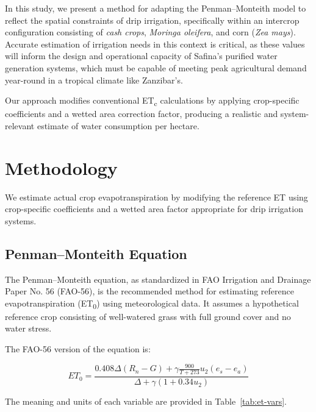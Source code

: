 \documentclass[twocolumn]{article}
\begin{document}
In this study, we present a method for adapting the Penman–Monteith model to reflect the spatial constraints of drip irrigation, specifically within an intercrop configuration consisting of \textit{cash crops}, \textit{Moringa oleifera}, and corn (\textit{Zea mays}). Accurate estimation of irrigation needs in this context is critical, as these values will inform the design and operational capacity of Safina’s purified water generation systems, which must be capable of meeting peak agricultural demand year-round in a tropical climate like Zanzibar’s.

Our approach modifies conventional ET\textsubscript{c} calculations by applying crop-specific coefficients and a wetted area correction factor, producing a realistic and system-relevant estimate of water consumption per hectare.

\section{Methodology}
We estimate actual crop evapotranspiration by modifying the reference ET using crop-specific coefficients and a wetted area factor appropriate for drip irrigation systems.

\subsection{Penman--Monteith Equation}

The Penman--Monteith equation, as standardized in FAO Irrigation and Drainage Paper No. 56 (FAO-56), is the recommended method for estimating reference evapotranspiration (ET\textsubscript{0}) using meteorological data. It assumes a hypothetical reference crop consisting of well-watered grass with full ground cover and no water stress.

The FAO-56 version of the equation is:

\[
ET_0 = \frac{0.408 \Delta (R_n - G) + \gamma \frac{900}{T + 273} u_2 (e_s - e_a)}{\Delta + \gamma (1 + 0.34 u_2)}
\]

The meaning and units of each variable are provided in Table~\ref{tab:et-vars}.
\end{document}
